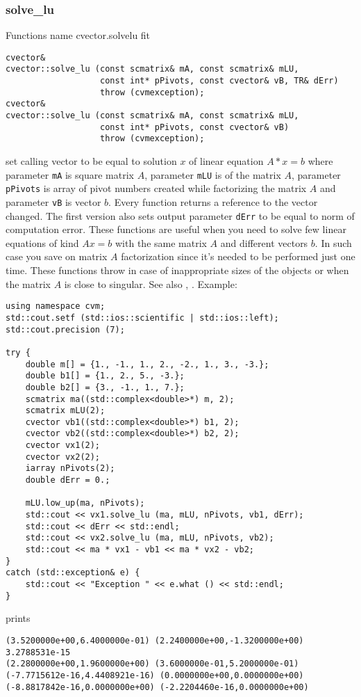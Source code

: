 \subsubsection{solve\_lu}
Functions%
\pdfdest name {cvector.solvelu} fit
\begin{verbatim}
cvector&
cvector::solve_lu (const scmatrix& mA, const scmatrix& mLU,
                   const int* pPivots, const cvector& vB, TR& dErr)
                   throw (cvmexception);
cvector&
cvector::solve_lu (const scmatrix& mA, const scmatrix& mLU,
                   const int* pPivots, const cvector& vB)
                   throw (cvmexception);
\end{verbatim}
set  calling vector to be equal to  solution $x$ of linear equation
$A*x=b$ where parameter \verb"mA" is  square matrix $A$,
parameter \verb"mLU" is 
of the matrix $A$, parameter \verb"pPivots" is  array of pivot numbers
created while factorizing the matrix $A$
and parameter \verb"vB" is  vector $b$.
Every function returns a reference to the vector changed.
The first version also sets output parameter \verb"dErr" to be equal
to  norm of computation error.
These functions are useful when you need to solve few linear equations
of kind $Ax=b$ with the same matrix $A$ and different vectors $b$.
In such case you save on matrix $A$ factorization since it's needed to be
performed just one time.
These functions throw 
in case of inappropriate sizes
of the objects or when the matrix $A$ is close to singular.
See also , .
Example:
\begin{Verbatim}
using namespace cvm;
std::cout.setf (std::ios::scientific | std::ios::left);
std::cout.precision (7);

try {
    double m[] = {1., -1., 1., 2., -2., 1., 3., -3.};
    double b1[] = {1., 2., 5., -3.};
    double b2[] = {3., -1., 1., 7.};
    scmatrix ma((std::complex<double>*) m, 2);
    scmatrix mLU(2);
    cvector vb1((std::complex<double>*) b1, 2);
    cvector vb2((std::complex<double>*) b2, 2);
    cvector vx1(2);
    cvector vx2(2);
    iarray nPivots(2);
    double dErr = 0.;

    mLU.low_up(ma, nPivots);
    std::cout << vx1.solve_lu (ma, mLU, nPivots, vb1, dErr);
    std::cout << dErr << std::endl;
    std::cout << vx2.solve_lu (ma, mLU, nPivots, vb2);
    std::cout << ma * vx1 - vb1 << ma * vx2 - vb2;
}
catch (std::exception& e) {
    std::cout << "Exception " << e.what () << std::endl;
}
\end{Verbatim}
prints
\begin{Verbatim}
(3.5200000e+00,6.4000000e-01) (2.2400000e+00,-1.3200000e+00)
3.2788531e-15
(2.2800000e+00,1.9600000e+00) (3.6000000e-01,5.2000000e-01)
(-7.7715612e-16,4.4408921e-16) (0.0000000e+00,0.0000000e+00)
(-8.8817842e-16,0.0000000e+00) (-2.2204460e-16,0.0000000e+00)
\end{Verbatim}
\newpage



